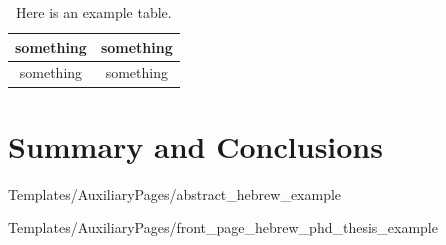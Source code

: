 \documentclass[a4paper,12pt,twoside,openany]{book}
\begin{document}
\begin{table}[h!]
    \centering
    \caption{Here is an example table.}
    \label{tbl:mytable}
    \begin{tabular}{c|c}

         something & something \\
         \hline
         something & something
    \end{tabular}
\end{table}


\chapter{Summary and Conclusions}
\label{sec_conclusions}





\backmatter
\pagestyle{empty}

            {Templates/AuxiliaryPages/abstract_hebrew_example}
\clearpage


            {Templates/AuxiliaryPages/front_page_hebrew_phd_thesis_example}
\clearpage
\end{document}
